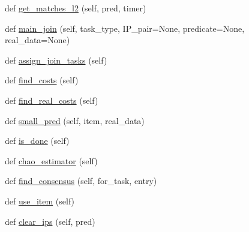 \begin{DoxyCompactItemize}
\item 
def \mbox{\hyperlink{classdynamicfilterapp_1_1models_1_1_join_a4d04d8503735b1728a4ed82a9d9fd070}{get\+\_\+matches\+\_\+l2}} (self, pred, timer)
\item 
def \mbox{\hyperlink{classdynamicfilterapp_1_1models_1_1_join_a62960f85abfb27dc5e3623c4790c6e70}{main\+\_\+join}} (self, task\+\_\+type, I\+P\+\_\+pair=None, predicate=None, real\+\_\+data=None)
\item 
def \mbox{\hyperlink{classdynamicfilterapp_1_1models_1_1_join_ad567a4773f2c57ad19df7e88ba5dc774}{assign\+\_\+join\+\_\+tasks}} (self)
\item 
def \mbox{\hyperlink{classdynamicfilterapp_1_1models_1_1_join_ac9cef0d40608117205ed9d5118f5f87c}{find\+\_\+costs}} (self)
\item 
def \mbox{\hyperlink{classdynamicfilterapp_1_1models_1_1_join_adb5d30a19bc96815ec8f79b9ddefb1cf}{find\+\_\+real\+\_\+costs}} (self)
\item 
def \mbox{\hyperlink{classdynamicfilterapp_1_1models_1_1_join_a7f921ca8a9fa8f58520cc49ac743dcac}{small\+\_\+pred}} (self, item, real\+\_\+data)
\item 
def \mbox{\hyperlink{classdynamicfilterapp_1_1models_1_1_join_ae557f7da2ff1786d7268f7226e89d42b}{is\+\_\+done}} (self)
\item 
def \mbox{\hyperlink{classdynamicfilterapp_1_1models_1_1_join_a582efaf16c8455e890ef61101a863966}{chao\+\_\+estimator}} (self)
\item 
def \mbox{\hyperlink{classdynamicfilterapp_1_1models_1_1_join_a767745d0dad333b32a77be416c2bb117}{find\+\_\+consensus}} (self, for\+\_\+task, entry)
\item 
def \mbox{\hyperlink{classdynamicfilterapp_1_1models_1_1_join_a53b3d6276057a6991b0e03cacb4818a9}{use\+\_\+item}} (self)
\item 
def \mbox{\hyperlink{classdynamicfilterapp_1_1models_1_1_join_aaf3c24b85bb49707bf5b8ab6da21068c}{clear\+\_\+ips}} (self, pred)
\end{DoxyCompactItemize}
